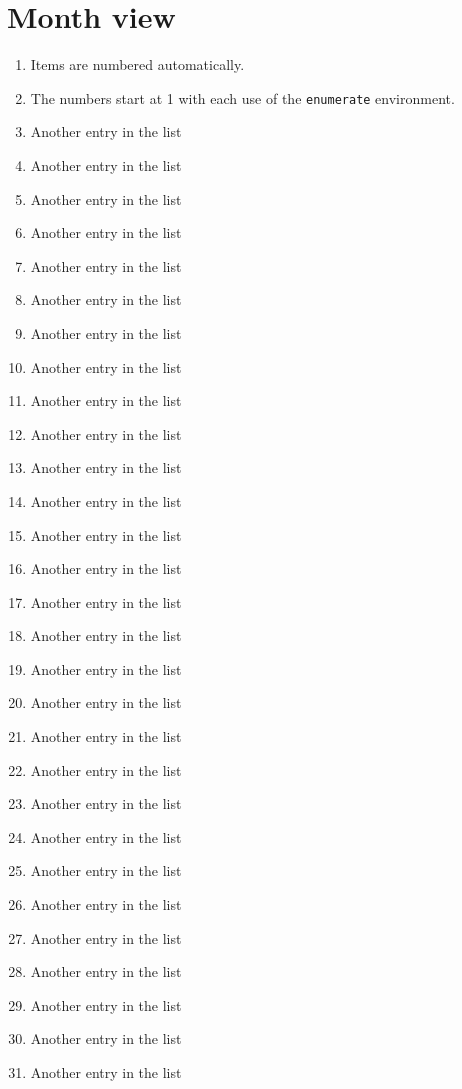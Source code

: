 \documentclass[a5paper,11pt]{article}
\begin{document}
	\section*{Month view}
\begin{enumerate}
  \item Items are numbered automatically.
  \item The numbers start at 1 with each use of the \texttt{enumerate} environment.
  \item Another entry in the list
  \item Another entry in the list
  \item Another entry in the list
  \item Another entry in the list
  \item Another entry in the list
  \item Another entry in the list
  \item Another entry in the list
  \item Another entry in the list
  \item Another entry in the list
  \item Another entry in the list
  \item Another entry in the list
  \item Another entry in the list
  \item Another entry in the list
  \item Another entry in the list
  \item Another entry in the list
  \item Another entry in the list
  \item Another entry in the list
  \item Another entry in the list
  \item Another entry in the list
  \item Another entry in the list
  \item Another entry in the list
  \item Another entry in the list
  \item Another entry in the list
  \item Another entry in the list
  \item Another entry in the list
  \item Another entry in the list
  \item Another entry in the list
  \item Another entry in the list
  \item Another entry in the list
\end{enumerate}	
\newpage
\end{document}
